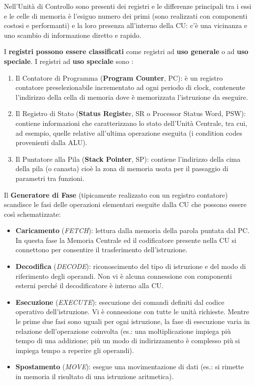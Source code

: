 \documentclass[12pt]{article} %
\begin{document}
\noindent Nell’Unità di Controllo sono presenti dei registri e le differenze principali tra i
essi e le celle di memoria è l’esiguo numero dei primi (sono realizzati con componenti costosi e performanti) e la loro presenza all’interno della CU: c’è una vicinanza e uno scambio di informazione diretto e rapido.\par\medskip\noindent
I \textbf{registri possono essere classificati} come registri ad \textbf{uso generale} o ad \textbf{uso speciale}.
\newpage
\noindent I registri ad \textbf{uso speciale} sono :
\begin{enumerate}
    \item Il Contatore di Programma (\textbf{Program Counter}, PC): è un registro contatore preselezionabile incrementato ad ogni periodo di clock, contenente l’indirizzo della cella di memoria dove è memorizzata l’istruzione da eseguire.
    \item Il Registro di Stato (\textbf{Status Registe}r, SR o Processor Status Word, PSW): contiene informazioni che caratterizzano lo stato dell’Unità Centrale, tra cui, ad esempio, quelle relative all’ultima operazione eseguita (i condition codes provenienti dalla ALU).
    \item Il Puntatore alla Pila (\textbf{Stack Pointer}, SP): contiene l’indirizzo della cima della pila (o canasta) cioè la zona di memoria usata per il passaggio di parametri tra funzioni. \par\medskip\noindent 
\end{enumerate}
Il \textbf{Generatore di Fase} (tipicamente realizzato con un registro contatore) scandisce le fasi delle operazioni elementari eseguite dalla CU che possono essere così schematizzate:
\begin{itemize}
    \item  \textbf{Caricamento} (\textit{FETCH}): lettura dalla memoria della parola puntata dal PC. In questa fase la Memoria Centrale ed il codificatore presente nella CU si connettono per consentire il trasferimento dell’istruzione.
    \item  \textbf{Decodifica} (\textit{DECODE}): riconoscimento del tipo di istruzione e del modo di riferimento degli operandi. Non vi è alcuna connessione con componenti esterni perché il decodificatore è interno alla CU.
    \item \textbf{Esecuzione} (\textit{EXECUTE}): esecuzione dei comandi definiti dal codice operativo dell’istruzione. Vi è connessione con tutte le unità richieste. Mentre le prime due fasi sono uguali per ogni istruzione, la fase di esecuzione varia in relazione dell’operazione coinvolta (es.: una moltiplicazione impiega più tempo di una addizione; più un modo di indirizzamento è complesso più si impiega tempo a reperire gli operandi).
    \item \textbf{Spostamento} (\textit{MOVE}): esegue una movimentazione di dati (es.: si rimette in memoria il risultato di una istruzione aritmetica).\par\medskip\noindent 
\end{itemize}
\end{document}
